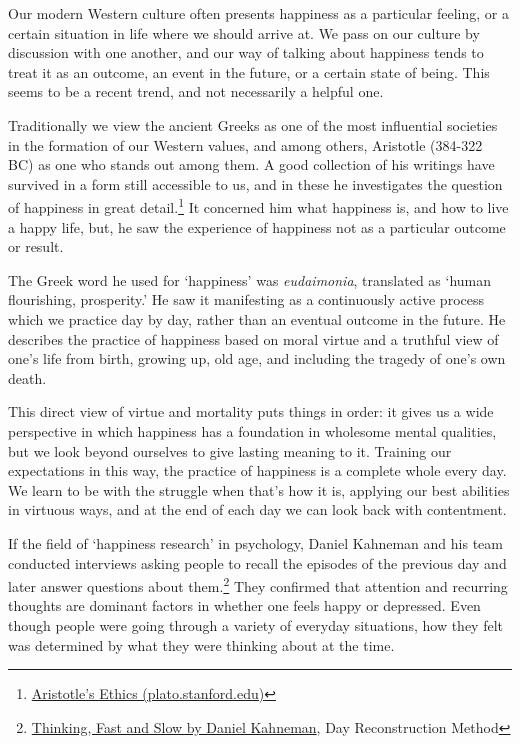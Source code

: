 
Our modern Western culture often presents happiness as a particular
feeling, or a certain situation in life where we should arrive at. We
pass on our culture by discussion with one another, and our way of
talking about happiness tends to treat it as an outcome, an event in the
future, or a certain state of being. This seems to be a recent trend,
and not necessarily a helpful one.

Traditionally we view the ancient Greeks as one of the most influential
societies in the formation of our Western values, and among others,
Aristotle (384-322 BC) as one who stands out among them. A good
collection of his writings have survived in a form still accessible to
us, and in these he investigates the question of happiness in great
detail.\footnote{\href{https://plato.stanford.edu/entries/aristotle-ethics/}{Aristotle's
  Ethics (plato.stanford.edu)}} It concerned him what happiness is, and
how to live a happy life, but, he saw the experience of happiness not as
a particular outcome or result.

The Greek word he used for `happiness' was \emph{eudaimonia}, translated
as `human flourishing, prosperity.' He saw it manifesting as a
continuously active process which we practice day by day, rather than an
eventual outcome in the future. He describes the practice of happiness
based on moral virtue and a truthful view of one's life from birth,
growing up, old age, and including the tragedy of one's own death.

This direct view of virtue and mortality puts things in order: it gives
us a wide perspective in which happiness has a foundation in wholesome
mental qualities, but we look beyond ourselves to give lasting meaning
to it. Training our expectations in this way, the practice of happiness
is a complete whole every day. We learn to be with the struggle when
that's how it is, applying our best abilities in virtuous ways, and at
the end of each day we can look back with contentment.

If the field of `happiness research' in psychology, Daniel Kahneman and
his team conducted interviews asking people to recall the episodes of
the previous day and later answer questions about them.\footnote{\href{https://www.goodreads.com/book/show/11468377-thinking-fast-and-slow}{Thinking,
  Fast and Slow by Daniel Kahneman}, Day Reconstruction Method} They
confirmed that attention and recurring thoughts are dominant factors in
whether one feels happy or depressed. Even though people were going
through a variety of everyday situations, how they felt was determined
by what they were thinking about at the time.

